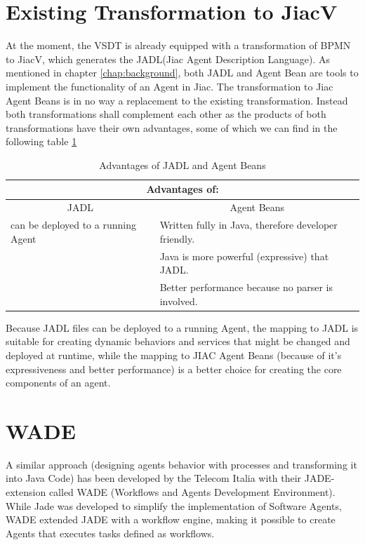 \section{Existing Transformation to JiacV}
At the moment, the VSDT is already equipped with a transformation of BPMN to JiacV, which generates the JADL(Jiac Agent Description Language).
As mentioned in chapter \ref{chap:background}, both JADL and Agent Bean are tools to implement the functionality of an Agent in Jiac. 
The transformation to Jiac Agent Beans is in no way a replacement to the existing transformation. Instead both transformations shall complement each other as the products of both transformations have their own advantages, some of which we can find in the following table \ref{tab:benefits}
\begin{table}[htbp]
	\centering
		\begin{tabularx}{\linewidth}{|l|X|}\hline\hline
			\multicolumn{2}{|c|}{\textbf{Advantages of:}} \\\hline
			\multicolumn{1}{|c|}{JADL} & \multicolumn{1}{c|}{Agent Beans}\\\hline
			can be deployed to a running Agent &  Written fully in Java, therefore developer friendly.\\
																				 &  Java is more powerful (expressive) that JADL.\\
			                           				 &  Better performance because no parser is involved.\\\hline\hline
		\end{tabularx}
		\caption{Advantages of JADL and Agent Beans}
		\label{tab:benefits}
\end{table}

\newpage
Because JADL files can be deployed to a running Agent, the mapping to JADL is suitable for creating dynamic behaviors and services that might be changed and deployed at runtime, while the mapping to JIAC Agent Beans (because of it's expressiveness and better performance) is a better choice for creating the core components of an agent. 


\section{WADE}
\label{sec:wade}
A similar approach (designing agents behavior with processes and transforming it into Java Code) has been developed by the Telecom Italia with their JADE-extension called WADE (Workflows and Agents Development Environment). While Jade was developed to simplify the implementation of Software Agents, WADE extended JADE with a workflow engine, making it possible to create Agents that executes tasks defined as workflows.

